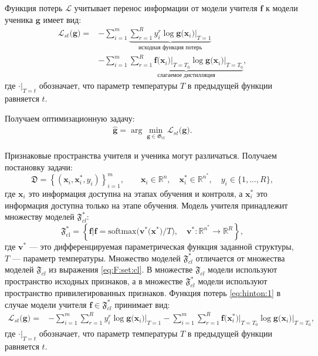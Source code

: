 \documentclass{dissert}
\begin{document}
Функция потерь $\mathcal{L}$ учитывает перенос информации от модели учителя $\mathbf{f}$ к модели ученика $\mathbf{g}$ имеет вид:
\[
\label{eq:hinton:1}
\begin{aligned}
   \mathcal{L}_{st}\bigr(\mathbf{g}\bigr) = &-\sum_{i=1}^{m}\underbrace{{\sum_{r=1}^{R}y^r_i\log\mathbf{g}\bigr(\mathbf{x}_i\bigr)\bigr|_{T=1}}}_{\text{исходная функция потерь}}\\
   &-\sum_{i=1}^{m}\underbrace{{\sum_{r=1}^{R}\mathbf{f}\bigr(\mathbf{x}_i\bigr)\bigr|_{T=T_0}\log\mathbf{g}\bigr(\mathbf{x}_i\bigr)\bigr|_{T=T_0}}}_{\text{слагаемое дистилляция}},
\end{aligned}
\]
где $\cdot\bigr|_{T=t}$ обозначает, что параметр температуры $T$ в предыдущей функции равняется $t$.

Получаем оптимизационную задачу:
\[
\label{eq:hinton:opt}
\begin{aligned}
   \hat{\mathbf{g}} = \arg\min_{\mathbf{g} \in \mathfrak{G}_{\text{cl}}} \mathcal{L}_{st}\bigr(\mathbf{g}\bigr).
\end{aligned}
\]

Признаковые пространства учителя и ученика могут различаться. Получаем постановку задачи:
\[
    \mathfrak{D} = \left\{\left(\mathbf{x}_i, \mathbf{x}^*_i, y_i\right)\right\}_{i=1}^{m}, \qquad \mathbf{x}_i \in \mathbb{R}^{n}, \quad \mathbf{x}^*_i \in \mathbb{R}^{n^*}, \quad y_i \in \{1, \ldots, R\},
\]
где $\mathbf{x}_i$ это информация доступна на этапах обучения и контроля, а $\mathbf{x}^*_i$ это информация доступна только на этапе обучения. Модель учителя принадлежит множеству моделей $\mathfrak{F}_{cl}^*$:
\[
\label{eq:F:set:cl:priv}
\mathfrak{F}_{\text{cl}}^* = \left\{\mathbf{f}| \mathbf{f} = \text{softmax}\bigr(\mathbf{v}^*\bigr(\mathbf{x}^*\bigr)/T\bigr), \quad \mathbf{v}^*: \mathbb{R}^{n^*} \to \mathbb{R}^R \right\},
\]
где $\mathbf{v}^*$ --- это дифференцируемая параметрическая функция заданной структуры, $T$ --- параметр температуры. Множество моделей $\mathfrak{F}_{cl}^*$ отличается от множества моделей $\mathfrak{F}_{cl}$ из выражения \eqref{eq:F:set:cl}. В множестве $\mathfrak{F}_{cl}$ модели используют пространство исходных признаков, а в множестве $\mathfrak{F}_{cl}^*$ модели используют пространство привилегированных признаков. Функция потерь \eqref{eq:hinton:1} в случае модели учителя $\mathbf{f} \in \mathfrak{F}_{cl}^*$ принимает вид:
\[
\label{eq:hinton:L:new}
\begin{aligned}
   \mathcal{L}_{st}\bigr(\mathbf{g}\bigr) = &-\sum_{i=1}^{m}{\sum_{r=1}^{R}y^r_i\log\mathbf{g}\bigr(\mathbf{x}_i\bigr)\bigr|_{T=1}}-\sum_{i=1}^{m}{\sum_{r=1}^{R}\mathbf{f}\bigr(\mathbf{x}^*_i\bigr)\bigr|_{T=T_0}\log\mathbf{g}\bigr(\mathbf{x}_i\bigr)\bigr|_{T=T_0}},
\end{aligned}
\]
где $\cdot\bigr|_{T=t}$ обозначает, что параметр температуры $T$ в предыдущей функции равняется $t$.
\end{document}
